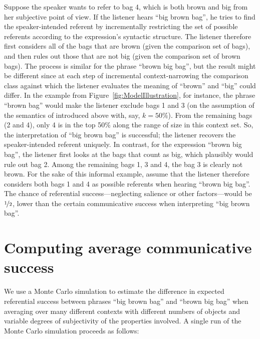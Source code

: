 \documentclass[10pt,a4paper]{article}
\begin{document}
Suppose the speaker wants to refer to bag 4, which is both brown and big from her subjective point of view. If the listener hears ``big brown bag'', he tries to find the speaker-intended referent by incrementally restricting the set of possible referents according to the expression's syntactic structure. The listener therefore first considers all of the bags that are brown (given the comparison set of bags), and then rules out those that are not big (given the comparison set of brown bags). The process is similar for the phrase ``brown big bag'', but the result might be different since at each step of incremental context-narrowing the comparison class against which the listener evaluates the meaning of ``brown'' and ``big'' could differ. In the example from Figure~\ref{fig:ModelIllustration}, for instance, the phrase ``brown bag'' would make the listener exclude bags 1 and 3 (on the assumption of the semantics of  introduced above with, say, $k = 50\%$). From the remaining bags (2 and 4), only 4 is in the top 50\% along the range of size in this context set. So, the interpretation of ``big brown bag'' is successful; the listener recovers the speaker-intended referent uniquely. In contrast, for the expression ``brown big bag'', the listener first looks at the bags that count as big, which plausibly would rule out bag 2. Among the remaining bags 1, 3 and 4, the bag 3 is clearly not brown. For the sake of this informal example, assume that the listener therefore considers both bags 1 and 4 as possible referents when hearing ``brown big bag''. The chance of referential success---neglecting salience or other factors---would be $\nicefrac{1}{2}$, lower than the certain communicative success when interpreting ``big brown bag''.


\section{Computing average communicative success}

We use a Monte Carlo simulation to estimate the difference in expected referential success between phrases ``big brown bag'' and ``brown big bag'' when averaging over many different contexts with different numbers of objects and variable degrees of subjectivity of the properties involved. A single run of the Monte Carlo simulation proceeds as follows:
\end{document}
